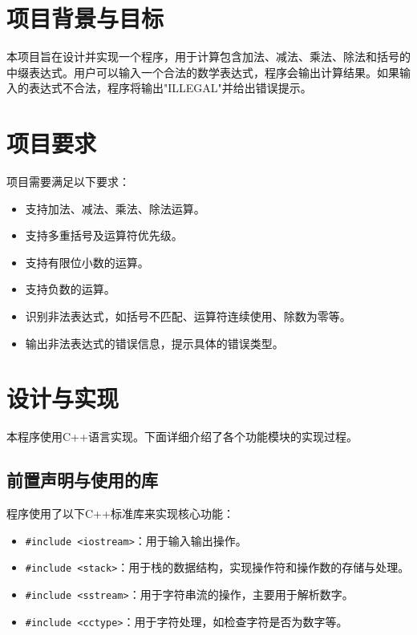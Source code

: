 \documentclass[UTF8]{ctexart}
\begin{document}
\pagestyle{fancy}
\fancyhead{}


\section{项目背景与目标}

本项目旨在设计并实现一个程序，用于计算包含加法、减法、乘法、除法和括号的中缀表达式。用户可以输入一个合法的数学表达式，程序会输出计算结果。如果输入的表达式不合法，程序将输出"ILLEGAL"并给出错误提示。

\section{项目要求}

项目需要满足以下要求：
\begin{itemize}
    \item 支持加法、减法、乘法、除法运算。
    \item 支持多重括号及运算符优先级。
    \item 支持有限位小数的运算。
    \item 支持负数的运算。
    \item 识别非法表达式，如括号不匹配、运算符连续使用、除数为零等。
    \item 输出非法表达式的错误信息，提示具体的错误类型。
\end{itemize}

\section{设计与实现}

本程序使用C++语言实现。下面详细介绍了各个功能模块的实现过程。

\subsection{前置声明与使用的库}

程序使用了以下C++标准库来实现核心功能：
\begin{itemize}
    \item \texttt{#include <iostream>}：用于输入输出操作。
    \item \texttt{#include <stack>}：用于栈的数据结构，实现操作符和操作数的存储与处理。
    \item \texttt{#include <sstream>}：用于字符串流的操作，主要用于解析数字。
    \item \texttt{#include <cctype>}：用于字符处理，如检查字符是否为数字等。
\end{itemize}
\end{document}
